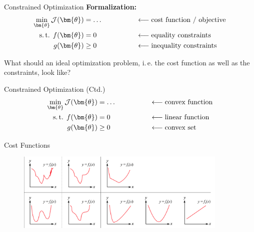 \begin{frame}{Constrained Optimization}{}
	\vspace*{-3mm}
	\textbf{Formalization:}
	\begin{alignat*}{2}
		\min_{\bm{\theta}} \mathcal{J}(\bm{\theta})
			&= \dots 
			&&\qquad\qquad\longleftarrow\text{cost function / objective}			\\
		\text{s.\,t. } f(\bm{\theta})
			&= 0
			&&\qquad\qquad\longleftarrow\text{equality constraints}				\\
		g(\bm{\theta})
			&\ge 0
			&&\qquad\qquad\longleftarrow\text{inequality constraints}
	\end{alignat*}

	\begin{boxBlueNoFrame}
		What should an ideal optimization problem, i.\,e. the cost function as well as the constraints, look like?
	\end{boxBlueNoFrame}
\end{frame}


\begin{frame}{Constrained Optimization (Ctd.)}{}
	\begin{alignat*}{2}
		\min_{\bm{\theta}} \mathcal{J}(\bm{\theta})
			&= \dots 
			&&\qquad\qquad\longleftarrow\text{convex function}			\\
		\text{s.\,t. } f(\bm{\theta})
			&= 0
			&&\qquad\qquad\longleftarrow\text{linear function}			\\
		g(\bm{\theta})
			&\ge 0
			&&\qquad\qquad\longleftarrow\text{convex set}
	\end{alignat*}
\end{frame}


\begin{frame}{Cost Functions}{}
	\vspace*{4mm}
	\begin{figure}
		\centering
		\includegraphics[width=0.9\textwidth]{02_math/02_img/cost_functions}
	\end{figure}
\end{frame}


